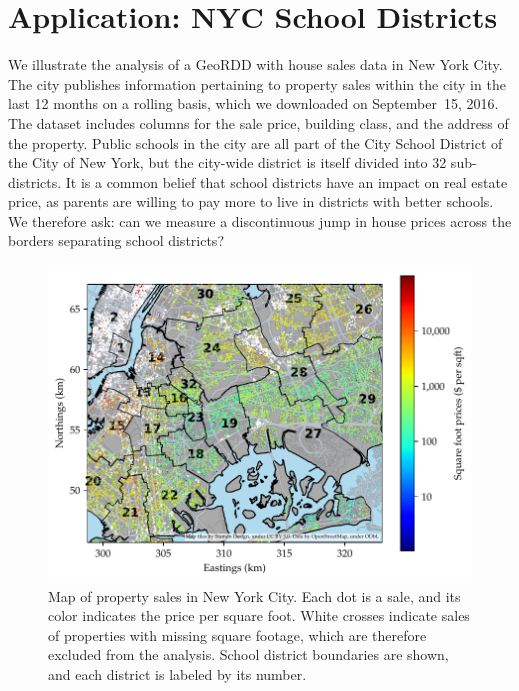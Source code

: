 \section{Application: NYC School Districts}
\label{sec:NYC_example}

We illustrate the analysis of a GeoRDD with house sales data in New York City.
The city publishes information pertaining to property sales within the city in the last 12 months on a rolling basis,
which we downloaded on September~15, 2016.
The dataset includes columns for the sale price, building class, and the address of the property.
Public schools in the city are all part of the City School District of the City of New York, but the city-wide district is itself divided into 32 sub-districts.
It is a common belief that school districts have an impact on real estate price, as parents are willing to pay more to live in districts with better schools.
We therefore ask: can we measure a discontinuous jump in house prices across the borders separating school districts?

\begin{figure}[tb]
    \centering
    \includegraphics[width=\textwidth,height=0.4\textheight,keepaspectratio]{figures/sales_map.pdf}
    \caption{\label{fig:sales_map}Map of property sales in New York City. Each dot is a sale, and its color indicates the price per square foot. White crosses indicate sales of properties with missing square footage, which are therefore excluded from the analysis. School district boundaries are shown, and each district is labeled by its number.}
\end{figure}

